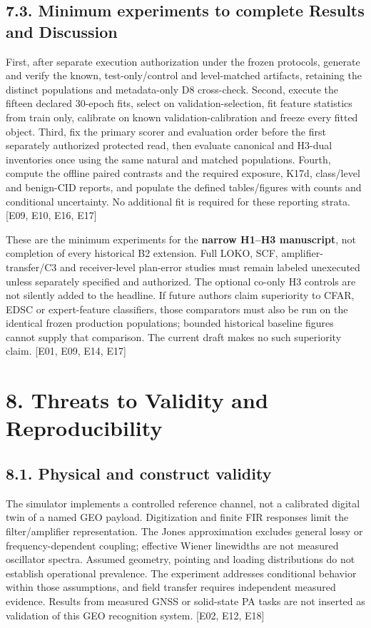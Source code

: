 \documentclass[
  10pt,
]{article}
\begin{document}
\subsection{7.3. Minimum experiments to complete Results and
Discussion}\label{minimum-experiments-to-complete-results-and-discussion}

First, after separate execution authorization under the frozen
protocols, generate and verify the known, test-only/control and
level-matched artifacts, retaining the distinct populations and
metadata-only D8 cross-check. Second, execute the fifteen declared
30-epoch fits, select on validation-selection, fit feature statistics
from train only, calibrate on known validation-calibration and freeze
every fitted object. Third, fix the primary scorer and evaluation order
before the first separately authorized protected read, then evaluate
canonical and H3-dual inventories once using the same natural and
matched populations. Fourth, compute the offline paired contrasts and
the required exposure, K17d, class/level and benign-CID reports, and
populate the defined tables/figures with counts and conditional
uncertainty. No additional fit is required for these reporting strata.
{[}E09, E10, E16, E17{]}

These are the minimum experiments for the \textbf{narrow H1--H3
manuscript}, not completion of every historical B2 extension. Full LOKO,
SCF, amplifier-transfer/C3 and receiver-level plan-error studies must
remain labeled unexecuted unless separately specified and authorized.
The optional co-only H3 controls are not silently added to the headline.
If future authors claim superiority to CFAR, EDSC or expert-feature
classifiers, those comparators must also be run on the identical frozen
production populations; bounded historical baseline figures cannot
supply that comparison. The current draft makes no such superiority
claim. {[}E01, E09, E14, E17{]}

\section{8. Threats to Validity and
Reproducibility}\label{threats-to-validity-and-reproducibility}

\subsection{8.1. Physical and construct
validity}\label{physical-and-construct-validity}

The simulator implements a controlled reference channel, not a
calibrated digital twin of a named GEO payload. Digitization and finite
FIR responses limit the filter/amplifier representation. The Jones
approximation excludes general lossy or frequency-dependent coupling;
effective Wiener linewidths are not measured oscillator spectra. Assumed
geometry, pointing and loading distributions do not establish
operational prevalence. The experiment addresses conditional behavior
within those assumptions, and field transfer requires independent
measured evidence. Results from measured GNSS or solid-state PA tasks
are not inserted as validation of this GEO recognition system. {[}E02,
E12, E18{]}
\end{document}
